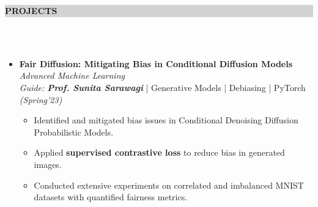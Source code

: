 \documentclass[a4paper,10pt]{article}
\newcommand{\lsep}{-0.5cm}
\newcommand{\resheading}[1]{{\small \colorbox{lightgray}{\begin{minipage}{0.975\textwidth}{\textbf{#1 \vphantom{p\^{E}}}}\end{minipage}}}}
\begin{document}
\resheading{\textbf{PROJECTS}}\\[\lsep] \\[-0.4cm]
\vspace{0.3cm}

\begin{itemize}[noitemsep,nolistsep]
\item \textbf{Fair Diffusion: Mitigating Bias in Conditional Diffusion Models} \hfill {\emph{Advanced Machine Learning}}\\
\emph{Guide: \textbf{Prof. Sunita Sarawagi}} | Generative Models | Debiasing | PyTorch   \hfill
\emph{(Spring'23)}
\vspace{0.1cm}
\begin{itemize}[noitemsep,nolistsep]
    \item Identified and mitigated bias issues in Conditional Denoising Diffusion Probabilistic Models.
    \vspace{0.07cm}

    \item Applied \textbf{supervised contrastive loss} to reduce bias in generated images.
    \vspace{0.07cm}
    
    \item Conducted extensive experiments on correlated and imbalanced MNIST datasets with quantified fairness metrics.
\end{itemize}


\end{itemize}
\end{document}
